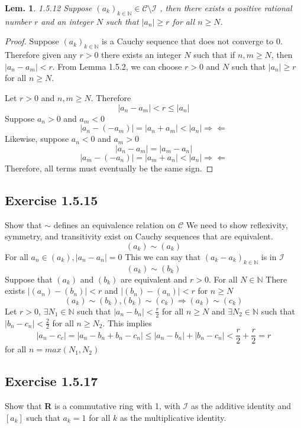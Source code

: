 \documentclass{tufte-book}
\theoremstyle{mytheoremstyle}
\theoremstyle{mylemstyle}
\newtheorem*{lem}{Lem.}
\theoremstyle{mydefstyle}
\begin{document}
\begin{lem}{1.5.12} Suppose $(a_k)_{k  \in \mathbb{N}} \in \mathcal{C} \setminus \mathcal{I}$  , then there exists a positive rational number $r$ and an integer $N$ such that $|a_n| \geq r$ for all $n \geq N$.
\end{lem}
\begin{proof} Suppose $(a_k)_{k \in \mathbb{N}}$ is a Cauchy sequence that does not converge to $0$. Therefore given any $r>0$ there exists an integer $N$ such that if $n,m \geq N$, then $|a_n - a_m| < r$.   From Lemma 1.5.2, we can choose $r >0$ and $N$ such that $|a_n| \geq r$ for all $n \geq N$. 

Let $r > 0$ and $n,m \geq N$. Therefore
\[|a_n - a_m| < r \leq |a_n|\] 
Suppose  $a_n > 0$ and $a_m < 0$
\[|a_n-(-a_m)| = |a_n + a_m| < |a_n|  \Rightarrow \Leftarrow \]  
Likewise, suppose $a_n < 0$ and $a_m > 0$
\[|a_n-a_m| = |a_m-a_n|\]
\[|a_m - (-a_n)| = |a_m+a_n| < |a_n|  \Rightarrow \Leftarrow \]
Therefore, all terms must eventually be the same sign.

\end{proof}


\subsection{Exercise 1.5.15}
Show that $\sim$ defines an equivalence relation on $\mathcal{C}$
We need to show reflexivity, symmetry, and transitivity exist on Cauchy sequences that are equivalent.
\[(a_k) \sim (a_k)\]
For all $a_n \in (a_k), |a_n-a_n| = 0$ This we can say that $(a_k-a_k)_{k \in \mathbb{N}}$ is in $\mathcal{I}$
\[(a_k) \sim (b_k)\]
Suppose that $(a_k)$ and $(b_k)$ are equivalent and $r > 0$. For all $N \in \mathbb{N}$ There exists $|(a_n)-(b_n)|<r$ and $|(b_n)-(a_n)|<r$ for $n \geq N$ 
\[(a_k) \sim (b_k) \text{,} (b_k) \sim (c_k) \Rightarrow (a_k) \sim (c_k)\]
Let $r>0$, $\exists N_1 \in \mathbb{N}$ such that $|a_n - b_n| < \frac{r}{2}$ for all $n \geq N$ and $\exists N_2 \in \mathbb{N}$ such that $|b_n - c_n| < \frac{2}{2}$ for all $n \geq N_2$.  This implies 
\[ |a_n - c_c| = |a_n - b_n + b_n-c_n| \leq |a_n - b_n| + |b_n - c_n| < \frac{r}{2} + \frac{r}{2} = r \]
for all $n = max(N_1,N_2)$

\subsection{Exercise 1.5.17}
Show that \textbf{R} is a commutative ring with 1, with $\mathcal{I}$ as the additive identity and $[a_k]$ such that $a_k=1$ for all $k$ as the multiplicative identity.
\end{document}
